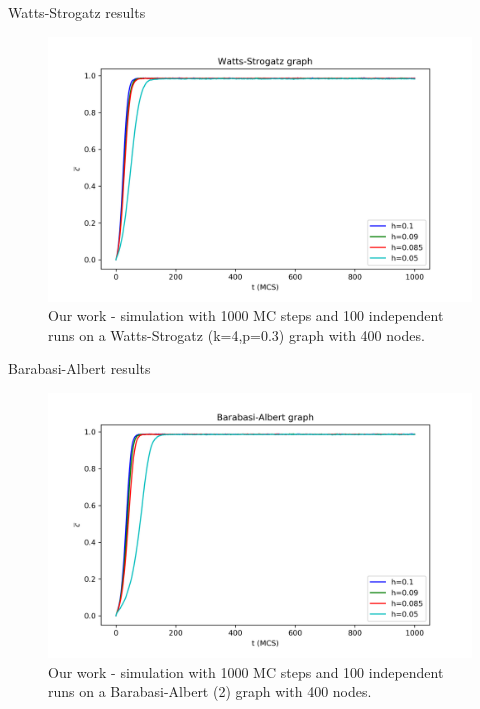 \documentclass[10pt]{beamer}
\begin{document}
\begin{frame}{Watts-Strogatz results}
	\begin{figure}
		\includegraphics[width=\textwidth]{../results/images/WS.png}
		\caption{Our work - simulation with 1000 MC steps and 100 independent runs on a Watts-Strogatz (k=4,p=0.3) graph with 400 nodes. }
	\end{figure}
\end{frame}

\begin{frame}{Barabasi-Albert results}
	\begin{figure}
		\includegraphics[width=\textwidth]{../results/images/BA.png}
		\caption{Our work - simulation with 1000 MC steps and 100 independent runs on a Barabasi-Albert (2) graph with 400 nodes. }
	\end{figure}
\end{frame}
\end{document}
